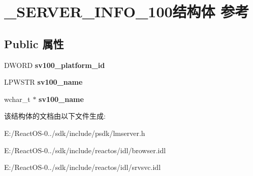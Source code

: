 \hypertarget{struct___s_e_r_v_e_r___i_n_f_o__100}{}\section{\+\_\+\+S\+E\+R\+V\+E\+R\+\_\+\+I\+N\+F\+O\+\_\+100结构体 参考}
\label{struct___s_e_r_v_e_r___i_n_f_o__100}
\subsection*{Public 属性}
\begin{DoxyCompactItemize}
\item 
\mbox{\label{struct___s_e_r_v_e_r___i_n_f_o__100_a1259b166a3c55ad13a26d46b9fff5247}} 
D\+W\+O\+RD {\bfseries sv100\+\_\+platform\+\_\+id}
\item 
\mbox{\label{struct___s_e_r_v_e_r___i_n_f_o__100_ad22cca2b2c1a0ad6ac41bd2faa4917e6}} 
L\+P\+W\+S\+TR {\bfseries sv100\+\_\+name}
\item 
\mbox{\label{struct___s_e_r_v_e_r___i_n_f_o__100_ade5b662d89a190ebb64b48a74ad9376b}} 
wchar\+\_\+t $\ast$ {\bfseries sv100\+\_\+name}
\end{DoxyCompactItemize}


该结构体的文档由以下文件生成\+:\begin{DoxyCompactItemize}
\item 
E\+:/\+React\+O\+S-\/0../sdk/include/psdk/lmserver.\+h\item 
E\+:/\+React\+O\+S-\/0../sdk/include/reactos/idl/browser.\+idl\item 
E\+:/\+React\+O\+S-\/0../sdk/include/reactos/idl/srvsvc.\+idl\end{DoxyCompactItemize}
